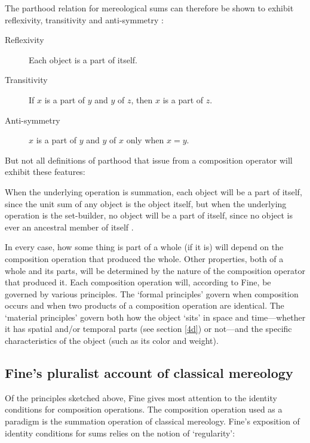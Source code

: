 \documentclass[11pt]{article}
\newenvironment{squote}{%
\begin{spacing}{1}
\begin{list}{}{%
\setlength{\labelwidth}{0pt}%
\rightmargin\leftmargin%
}
\item\relax
}{%
\end{list}%
\end{spacing}
}
\begin{document}
\begin{spacing}{1.5}
The parthood relation for mereological sums can therefore be shown to
exhibit reflexivity, transitivity and anti-symmetry
\citep[568]{fine2010}:

\begin{description}
\item[Reflexivity] Each object is a part of itself.
\item[Transitivity] If $x$ is a part of $y$ and $y$ of $z$, then $x$
  is a part of $z$.
\item[Anti-symmetry] $x$ is a part of $y$ and $y$ of $x$ only when $x
  = y$.
\end{description}

But not all definitions of parthood that issue from a composition
operator will exhibit these features:

\begin{squote}
When the underlying operation is summation, each object will be a part
of itself, since the unit sum of any object is the object itself, but
when the underlying operation is the set-builder, no object will be a
part of itself, since no object is ever an ancestral member of itself
\citep[569]{fine2010}.
\end{squote}

In every case, how some thing is part of a whole (if it is) will
depend on the composition operation that produced the whole.  Other
properties, both of a whole and its parts, will be determined by the
nature of the composition operator that produced it.  Each composition
operation will, according to Fine, be governed by various principles.
The `formal principles' govern when composition occurs and when two
products of a composition operation are identical.  The `material
principles' govern both how the object `sits' in space and
time---whether it has spatial and/or temporal parts (see section
\ref{4d}) or not---and the specific characteristics of the object
(such as its color and weight).

\subsection{Fine's pluralist account of classical mereology}
\label{classical}
Of the principles sketched above, Fine gives most attention to the
identity conditions for composition operations.  The composition
operation used as a paradigm is the summation operation of classical
mereology.  Fine's exposition of identity conditions for sums relies
on the notion of `regularity':


\end{spacing}
\end{document}
